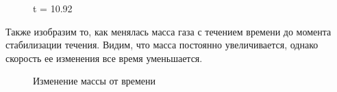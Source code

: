 \documentclass[specialist,subf,href,colorlinks=true,12pt
,times,mtpro,specialist
]{disser}
\begin{document}
\begin{figure}[H]
\begin{minipage}[h]{0.49\linewidth}
\end{minipage}
\hfill
\begin{minipage}[h]{0.49\linewidth}
\end{minipage}
\caption*{t = 10.92}
\end{figure}

Также изобразим то, как менялась масса газа с течением времени до момента стабилизации течения. Видим, что масса постоянно увеличивается, однако скорость ее изменения все время уменьшается.

\begin{figure}[H]
\caption*{Изменение массы от времени}
\end{figure}
\end{document}
